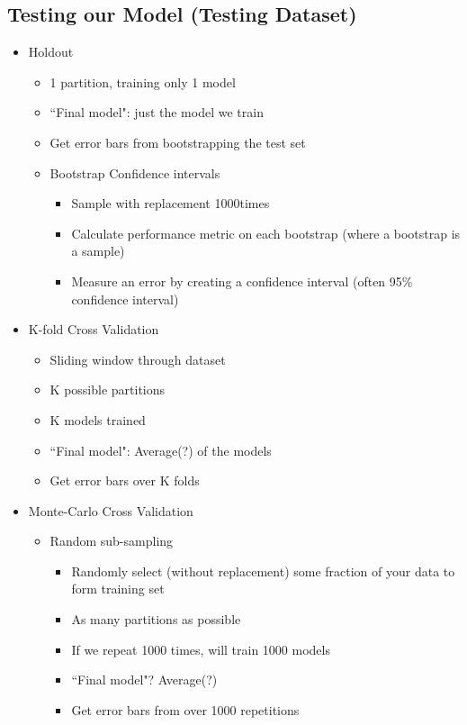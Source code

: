 \documentclass[10pt, oneside]{article}
\begin{document}
\subsection{Testing our Model (Testing Dataset)}
\begin{itemize}
    \item Holdout
    \begin{itemize}
        \item 1 partition, training only 1 model
        \item ``Final model": just the model we train
        \item Get error bars from bootstrapping the test set
        \item Bootstrap Confidence intervals
        \begin{itemize}
            \item Sample with replacement 1000times
            \item Calculate performance metric on each bootstrap (where a bootstrap is a sample)
            \item Measure an error by creating a confidence interval (often 95\% confidence interval)
        \end{itemize}
    \end{itemize}
    \item K-fold Cross Validation
    \begin{itemize}
        \item Sliding window through dataset
        \item K possible partitions
        \item K models trained
        \item ``Final model": Average(?) of the models
        \item Get error bars over K folds
    \end{itemize}
    \item Monte-Carlo Cross Validation
    \begin{itemize}
        \item Random sub-sampling
        \begin{itemize}
            \item Randomly select (without replacement) some fraction of your data to form training set
            \item As many partitions as possible
            \item If we repeat 1000 times, will train 1000 models
            \item ``Final model"? Average(?)
            \item Get error bars from over 1000 repetitions
        \end{itemize}
    \end{itemize}
\end{itemize}
\end{document}
